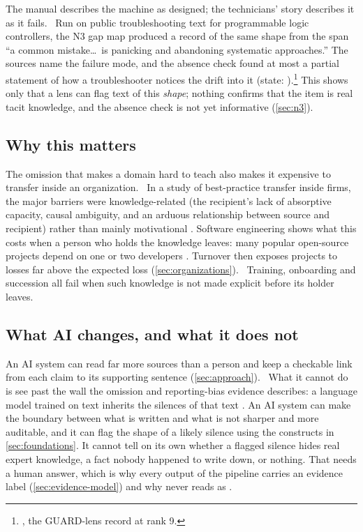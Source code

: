 The manual describes the machine as designed; the technicians' story
describes it as it fails. \evobs\ Run on public troubleshooting text for
programmable logic controllers, the N3 gap map produced a record of the same
shape from the span ``a common mistake\dots\ is panicking and abandoning
systematic approaches.'' The sources name the failure mode, and the absence
check found at most a partial statement of how a troubleshooter notices the
drift into it (state: ).\footnote{%
  , the GUARD-lens record at rank 9.}
This shows only that a lens can flag text of this \emph{shape}; nothing
confirms that the item is real tacit knowledge, and the absence check is not
yet informative (\cref{sec:n3}).

\subsection{Why this matters}

The omission that makes a domain hard to teach also makes it expensive to
transfer inside an organization. \evlit\ In a study of best-practice
transfer inside firms, the major barriers were knowledge-related (the
recipient's lack of absorptive capacity, causal ambiguity, and an arduous
relationship between source and recipient) rather than mainly motivational
\parencite{szulanski1996exploring}. Software engineering shows what this costs when a
person who holds the knowledge leaves: many popular open-source projects
depend on one or two developers \parencite{avelino2016novel}. Turnover then
exposes projects to losses far above the expected loss
\parencite{rigby2016quantifying,nassif2017revisiting}
(\cref{sec:organizations}). \evint\ Training, onboarding and succession all
fail when such knowledge is not made explicit before its holder leaves.

\subsection{What AI changes, and what it does not}

An AI system can read far more sources than a person and keep a checkable
link from each claim to its supporting sentence (\cref{sec:approach}).
\evint\ What it cannot do is see past the wall the omission
and reporting-bias evidence describes: a language model trained on text
inherits the silences of that text \parencite{paik2021world}. An AI system
can make the boundary between what is written and what is not sharper and
more auditable, and it can flag the shape of a likely silence using the
constructs in \cref{sec:foundations}. It cannot tell on its own whether a
flagged silence hides real expert knowledge, a fact nobody happened to write
down, or nothing. That needs a human answer, which is why every output of
the pipeline carries an evidence label (\cref{sec:evidence-model}) and why
 never reads as .
